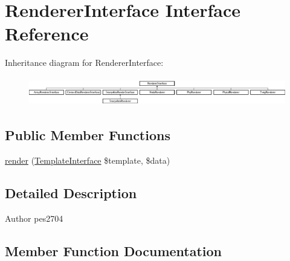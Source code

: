 \hypertarget{interface_pes_1_1_view_1_1_renderer_1_1_renderer_interface}{}\section{Renderer\+Interface Interface Reference}
\label{interface_pes_1_1_view_1_1_renderer_1_1_renderer_interface}
Inheritance diagram for Renderer\+Interface\+:\begin{figure}[H]
\begin{center}
\leavevmode
\includegraphics[height=1.256545cm]{interface_pes_1_1_view_1_1_renderer_1_1_renderer_interface}
\end{center}
\end{figure}
\subsection*{Public Member Functions}
\begin{DoxyCompactItemize}
\item 
\mbox{\hyperlink{interface_pes_1_1_view_1_1_renderer_1_1_renderer_interface_ab273a8d7deb9bb9235161c4f8419e402}{render}} (\mbox{\hyperlink{interface_pes_1_1_view_1_1_template_1_1_template_interface}{Template\+Interface}} \$template, \$data)
\end{DoxyCompactItemize}


\subsection{Detailed Description}
\begin{DoxyAuthor}{Author}
pes2704 
\end{DoxyAuthor}


\subsection{Member Function Documentation}
\mbox{\label{interface_pes_1_1_view_1_1_renderer_1_1_renderer_interface_ab273a8d7deb9bb9235161c4f8419e402}} 
